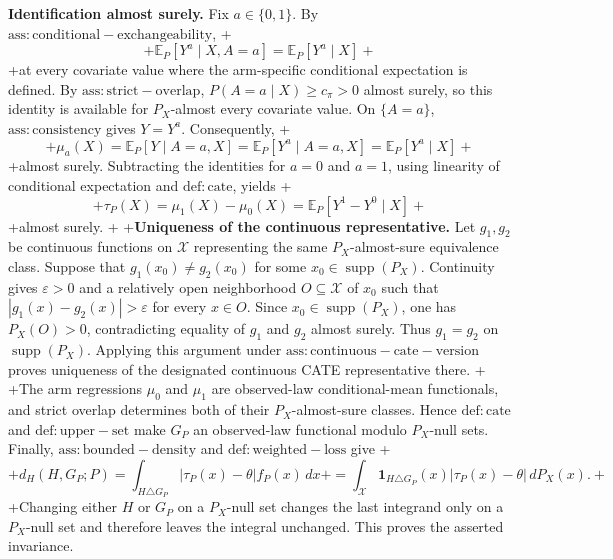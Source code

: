 \textbf{Identification almost surely.} Fix \(a\in\{0,1\}\). By \(\mathrm{ass:conditional-exchangeability}\),
+\[
+\mathbb E_P[Y^a\mid X,A=a]=\mathbb E_P[Y^a\mid X]
+\]
+at every covariate value where the arm-specific conditional expectation is defined. By \(\mathrm{ass:strict-overlap}\), \(P(A=a\mid X)\ge c_\pi>0\) almost surely, so this identity is available for \(P_X\)-almost every covariate value. On \(\{A=a\}\), \(\mathrm{ass:consistency}\) gives \(Y=Y^a\). Consequently,
+\[
+\mu_a(X)=\mathbb E_P[Y\mid A=a,X]=\mathbb E_P[Y^a\mid A=a,X]=\mathbb E_P[Y^a\mid X]
+\]
+almost surely. Subtracting the identities for \(a=0\) and \(a=1\), using linearity of conditional expectation and \(\mathrm{def:cate}\), yields
+\[
+\tau_P(X)=\mu_1(X)-\mu_0(X)=\mathbb E_P[Y^1-Y^0\mid X]
+\]
+almost surely.
+
+\textbf{Uniqueness of the continuous representative.} Let \(g_1,g_2\) be continuous functions on \(\mathcal X\) representing the same \(P_X\)-almost-sure equivalence class. Suppose that \(g_1(x_0)\ne g_2(x_0)\) for some \(x_0\in\operatorname{supp}(P_X)\). Continuity gives \(\varepsilon>0\) and a relatively open neighborhood \(O\subseteq\mathcal X\) of \(x_0\) such that \(|g_1(x)-g_2(x)|>\varepsilon\) for every \(x\in O\). Since \(x_0\in\operatorname{supp}(P_X)\), one has \(P_X(O)>0\), contradicting equality of \(g_1\) and \(g_2\) almost surely. Thus \(g_1=g_2\) on \(\operatorname{supp}(P_X)\). Applying this argument under \(\mathrm{ass:continuous-cate-version}\) proves uniqueness of the designated continuous CATE representative there.
+
+The arm regressions \(\mu_0\) and \(\mu_1\) are observed-law conditional-mean functionals, and strict overlap determines both of their \(P_X\)-almost-sure classes. Hence \(\mathrm{def:cate}\) and \(\mathrm{def:upper-set}\) make \(G_P\) an observed-law functional modulo \(P_X\)-null sets. Finally, \(\mathrm{ass:bounded-density}\) and \(\mathrm{def:weighted-loss}\) give
+\[
+d_H(H,G_P;P)=\int_{H\triangle G_P}|\tau_P(x)-\theta|f_P(x)\,dx
+=\int_{\mathcal X}\mathbf 1_{H\triangle G_P}(x)|\tau_P(x)-\theta|\,dP_X(x).
+\]
+Changing either \(H\) or \(G_P\) on a \(P_X\)-null set changes the last integrand only on a \(P_X\)-null set and therefore leaves the integral unchanged. This proves the asserted invariance.